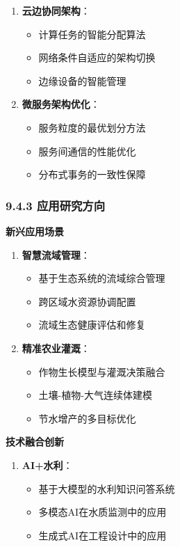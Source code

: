 \begin{enumerate} \def\labelenumi{\arabic{enumi}.} \tightlist \item \textbf{云边协同架构}： \begin{itemize} \tightlist \item
计算任务的智能分配算法 \item 网络条件自适应的架构切换 \item 边缘设备的智能管理 \end{itemize} \item \textbf{微服务架构优化}： \begin{itemize} \tightlist \item
服务粒度的最优划分方法 \item 服务间通信的性能优化 \item 分布式事务的一致性保障 \end{itemize} \end{enumerate} \subsubsection{9.4.3
应用研究方向}\label{ux5e94ux7528ux7814ux7a76ux65b9ux5411} \textbf{新兴应用场景} \begin{enumerate} \def\labelenumi{\arabic{enumi}.}
\tightlist \item \textbf{智慧流域管理}： \begin{itemize} \tightlist \item 基于生态系统的流域综合管理 \item 跨区域水资源协调配置 \item 流域生态健康评估和修复
\end{itemize} \item \textbf{精准农业灌溉}： \begin{itemize} \tightlist \item 作物生长模型与灌溉决策融合 \item 土壤-植物-大气连续体建模 \item 节水增产的多目标优化
\end{itemize} \end{enumerate} \textbf{技术融合创新} \begin{enumerate} \def\labelenumi{\arabic{enumi}.} \tightlist \item
\textbf{AI+水利}： \begin{itemize} \tightlist \item 基于大模型的水利知识问答系统 \item 多模态AI在水质监测中的应用 \item 生成式AI在工程设计中的应用 \end{itemize}

\end{enumerate}
